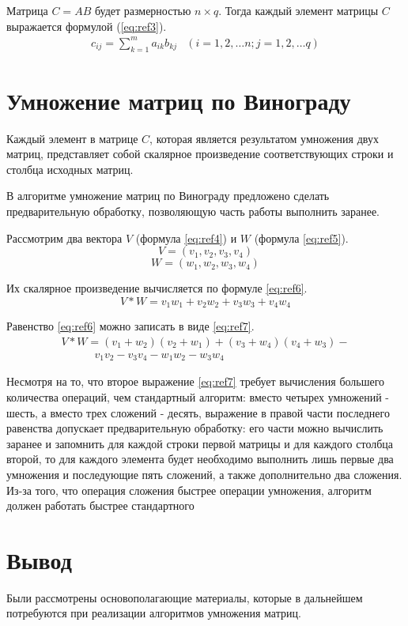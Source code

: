 Матрица $C = AB$ будет размерностью $n \times q$.
Тогда каждый элемент матрицы $C$ выражается формулой (\ref{eq:ref3}).
\begin{equation}
	\begin{array}{cc}
		c_{ij} = \sum\limits_{k=1}^m a_{ik}b_{kj} & (i=1,2,\dots n; j=1,2,\dots q)
	\end{array}
	\label{eq:ref3}
\end{equation}

\section{Умножение матриц по Винограду}

Каждый элемент в матрице $C$, которая является результатом умножения двух матриц, представляет собой скалярное произведение соответствующих строки и столбца исходных матриц. 

В алгоритме умножение матриц по Винограду предложено сделать предварительную обработку, позволяющую часть работы выполнить заранее.

Рассмотрим два вектора $V$ (формула \ref{eq:ref4}) и $W$ (формула \ref{eq:ref5}).
\begin{equation}
	V = (v_1, v_2, v_3, v_4)
	\label{eq:ref4}
\end{equation}
\begin{equation}
	W = (w_1, w_2, w_3, w_4)
	\label{eq:ref5}
\end{equation}

Их скалярное произведение вычисляется по формуле  \ref{eq:ref6}.
\begin{equation}
	V * W = v_1w_1 + v_2w_2 + v_3w_3 + v_4w_4
	\label{eq:ref6}
\end{equation}

Равенство \ref{eq:ref6} можно записать в виде \ref{eq:ref7}.
\begin{equation}
	\begin{array}{l}
		V * W = (v_1 + w_2)(v_2 + w_1) + (v_3 + w_4)(v_4 + w_3) - \\
		\quad \quad \quad v_1v_2 - v_3v_4 - w_1w_2 - w_3w_4
	\end{array}
	\label{eq:ref7}
\end{equation}

Несмотря на то, что второе выражение \ref{eq:ref7} требует вычисления большего количества операций, чем стандартный алгоритм: вместо четырех умножений - шесть, а вместо трех сложений - десять, выражение в правой части последнего равенства допускает предварительную обработку: его части можно вычислить заранее и запомнить для каждой строки первой матрицы и для каждого столбца второй, то для каждого элемента будет необходимо выполнить лишь первые два умножения и последующие пять сложений, а также дополнительно два сложения. Из-за того, что операция сложения быстрее операции умножения, алгоритм должен работать быстрее стандартного


\section{Вывод}
Были рассмотрены основополагающие материалы, которые в дальнейшем потребуются при реализации алгоритмов умножения матриц.  
